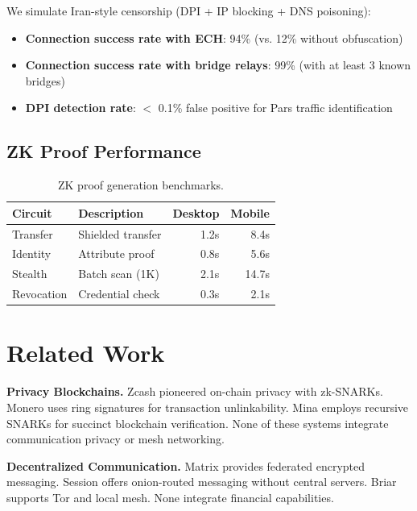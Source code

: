 \documentclass[11pt,a4paper,twocolumn]{article}
\begin{document}
We simulate Iran-style censorship (DPI + IP blocking + DNS poisoning):
\begin{itemize}[leftmargin=*]
  \item \textbf{Connection success rate with ECH}: 94\% (vs. 12\% without obfuscation)
  \item \textbf{Connection success rate with bridge relays}: 99\% (with at least 3 known bridges)
  \item \textbf{DPI detection rate}: $<$ 0.1\% false positive for Pars traffic identification
\end{itemize}

\subsection{ZK Proof Performance}

\begin{table}[H]
\centering
\caption{ZK proof generation benchmarks.}
\label{tab:zk-bench}
\begin{tabularx}{\columnwidth}{lXrr}
\toprule
\textbf{Circuit} & \textbf{Description} & \textbf{Desktop} & \textbf{Mobile} \\
\midrule
Transfer & Shielded transfer & 1.2s & 8.4s \\
Identity & Attribute proof & 0.8s & 5.6s \\
Stealth & Batch scan (1K) & 2.1s & 14.7s \\
Revocation & Credential check & 0.3s & 2.1s \\
\bottomrule
\end{tabularx}
\end{table}

\section{Related Work}
\label{sec:related}

\textbf{Privacy Blockchains.} Zcash \cite{sasson2014zerocash} pioneered on-chain privacy with zk-SNARKs. Monero \cite{noether2015ring} uses ring signatures for transaction unlinkability. Mina \cite{bonneau2020mina} employs recursive SNARKs for succinct blockchain verification. None of these systems integrate communication privacy or mesh networking.

\textbf{Decentralized Communication.} Matrix \cite{matrix2019spec} provides federated encrypted messaging. Session \cite{session2020} offers onion-routed messaging without central servers. Briar \cite{briar2018} supports Tor and local mesh. None integrate financial capabilities.
\end{document}
